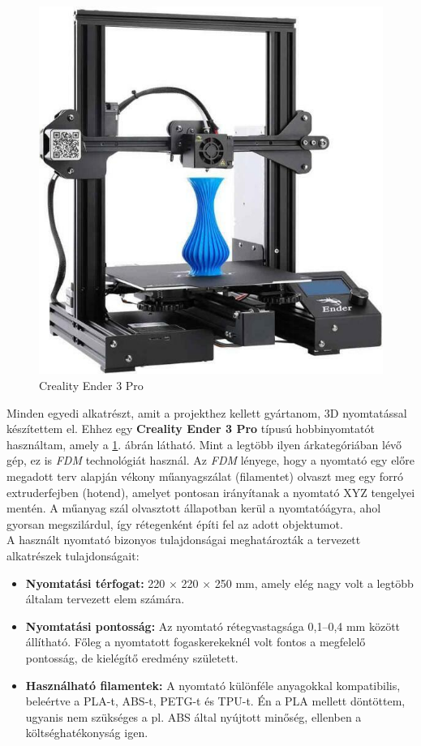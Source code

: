 \documentclass[12pt,a4paper]{article}
\begin{document}
\begin{figure}
	\centering
	\includegraphics[width=.9\linewidth]{mech_ender} 
	\caption{Creality Ender 3 Pro \cite{ender}}
	\label{fig:mech_ender}
\end{figure}

Minden egyedi alkatrészt, amit a projekthez kellett gyártanom, 3D nyomtatással készítettem el. Ehhez egy \textbf{Creality Ender 3 Pro} típusú hobbinyomtatót használtam, amely a \ref{fig:mech_ender}. ábrán látható. Mint a legtöbb ilyen árkategóriában lévő gép, ez is \textsl{FDM} technológiát használ. Az \textsl{FDM} lényege, hogy a nyomtató egy előre megadott terv alapján vékony műanyagszálat (filamentet) olvaszt meg egy forró extruderfejben (hotend), amelyet pontosan irányítanak a nyomtató XYZ tengelyei mentén. A műanyag szál olvasztott állapotban kerül a nyomtatóágyra, ahol gyorsan megszilárdul, így rétegenként építi fel az adott objektumot.\\

A használt nyomtató bizonyos tulajdonságai meghatározták a tervezett alkatrészek tulajdonságait:

\begin{itemize}
	\item \textbf{Nyomtatási térfogat:} 220 × 220 × 250 mm, amely elég nagy volt a legtöbb általam tervezett elem számára.
	\item \textbf{Nyomtatási pontosság:} Az nyomtató rétegvastagsága 0,1–0,4 mm között állítható. Főleg a nyomtatott fogaskerekeknél volt fontos a megfelelő pontosság, de kielégítő eredmény született.
	\item \textbf{Használható filamentek:} A nyomtató különféle anyagokkal kompatibilis, beleértve a PLA-t, ABS-t, PETG-t és TPU-t. Én a PLA mellett döntöttem, ugyanis nem szükséges a pl. ABS által nyújtott minőség, ellenben a költséghatékonyság igen.
\end{itemize}
\end{document}

